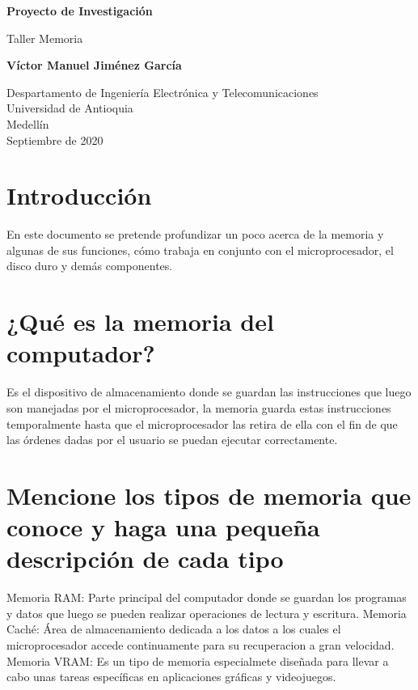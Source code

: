 \documentclass{article}
\begin{document}
\begin{titlepage}
    \begin{center}
        \vspace*{1cm}
            
        \Huge
        \textbf{Proyecto de Investigación}
            
        \vspace{0.5cm}
        \LARGE
        Taller Memoria
            
        \vspace{1.5cm}
            
        \textbf{Víctor Manuel Jiménez García}
            
        \vfill
            
        \vspace{0.8cm}
            
        \Large
        Despartamento de Ingeniería Electrónica y Telecomunicaciones\\
        Universidad de Antioquia\\
        Medellín\\
        Septiembre de 2020
            
    \end{center}
\end{titlepage}

\tableofcontents
\section{Introducción}
En este documento se pretende profundizar un poco acerca de la memoria y algunas de sus funciones, cómo trabaja en conjunto con el microprocesador, el disco duro y demás componentes.
\section{¿Qué es la memoria del computador?}
Es el dispositivo de almacenamiento donde se guardan las instrucciones que luego son manejadas por el microprocesador, la memoria guarda estas instrucciones temporalmente hasta que el microprocesador las retira de ella con el fin de que las órdenes dadas por el usuario se puedan ejecutar correctamente.
\cite{memoria}
\section{Mencione los tipos de memoria que conoce y haga una pequeña descripción de cada tipo} \label{contenido}
Memoria RAM: Parte principal del computador donde se guardan los programas y datos que luego se pueden realizar operaciones de lectura y escritura.
Memoria Caché: Área de almacenamiento dedicada a los datos a los cuales el microprocesador accede continuamente para su recuperacion a gran velocidad.
Memoria VRAM: Es un tipo de memoria especialmete diseñada para llevar a cabo unas tareas específicas en aplicaciones gráficas y videojuegos.
\cite{vram}
\end{document}
